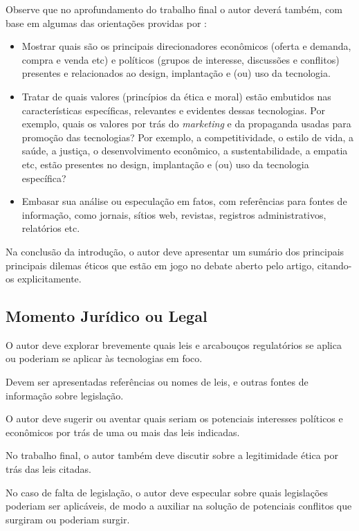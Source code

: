 \documentclass[12pt]{article}
\begin{document}
	Observe que no aprofundamento do trabalho final o autor deverá também, com base em algumas das orientações providas por \citet{jones_doing_2016}:
	\begin{itemize}
		\item  Mostrar quais são os principais direcionadores econômicos (oferta e demanda, compra e venda etc) e políticos (grupos de interesse, discussões e conflitos) presentes e relacionados ao design, implantação e (ou) uso da tecnologia.

		\item  Tratar de quais valores (princípios da ética e moral) estão embutidos nas características específicas, relevantes e evidentes dessas tecnologias. Por exemplo, quais os valores por trás do \textit{marketing} e da propaganda usadas para promoção das tecnologias? Por exemplo, a competitividade, o estilo de vida, a saúde, a justiça, o desenvolvimento econômico, a sustentabilidade, a empatia etc, estão presentes no design, implantação e (ou) uso da tecnologia específica?

		\item  Embasar sua análise ou especulação em fatos, com referências para fontes de informação, como jornais, sítios web, revistas, registros administrativos, relatórios etc.
	\end{itemize}

	Na conclusão da introdução, o autor deve apresentar um sumário dos principais principais dilemas éticos que estão em jogo no debate aberto pelo artigo, citando-os explicitamente.

	\subsection{\label{legal}Momento Jurídico ou Legal}
	O autor deve explorar brevemente quais leis e arcabouços regulatórios se aplica ou poderiam se aplicar às tecnologias em foco.

	Devem ser apresentadas referências ou nomes de leis, e outras fontes de informação sobre legislação.

	O autor deve sugerir ou aventar quais seriam os potenciais interesses políticos e econômicos por trás de uma ou mais das leis indicadas.

	No trabalho final, o autor também deve discutir sobre a legitimidade ética por trás das leis citadas.

	No caso de falta de legislação, o autor deve especular sobre quais legislações poderiam ser aplicáveis, de modo a auxiliar na solução de potenciais conflitos que surgiram ou poderiam surgir.
\end{document}
